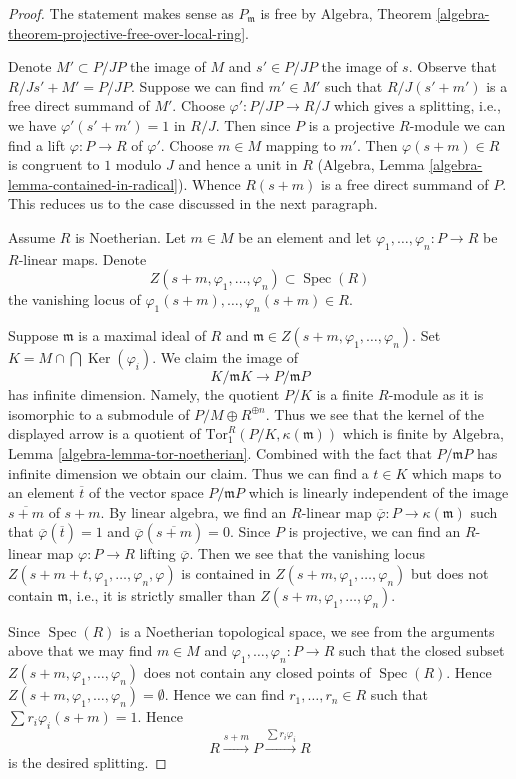 \documentclass[10pt,a4paper]{amsart}
\theoremstyle{plain}
\theoremstyle{definition}
\theoremstyle{remark}
\numberwithin{equation}{subsection}
\def\Spec{\mathop{\mathrm{Spec}}}
\def\Ker{\mathop{\mathrm{Ker}}}
\begin{document}
\begin{proof}
The statement makes sense as $P_\mathfrak m$ is free by
Algebra, Theorem \ref{algebra-theorem-projective-free-over-local-ring}.

\medskip\noindent
Denote $M' \subset P/JP$ the image of $M$ and $s' \in P/JP$ the
image of $s$. Observe that $R/J s' + M' = P/JP$.
Suppose we can find $m' \in M'$ such that
$R/J(s' + m')$ is a free direct summand of $M'$.
Choose $\varphi' : P/JP \to R/J$ which gives a splitting, i.e.,
we have $\varphi'(s' + m') = 1$ in $R/J$.
Then since $P$ is a projective $R$-module we can find
a lift $\varphi : P \to R$ of $\varphi'$.
Choose $m \in M$ mapping to $m'$.
Then $\varphi(s + m) \in R$ is congruent to $1$ modulo $J$ and hence
a unit in $R$ (Algebra, Lemma \ref{algebra-lemma-contained-in-radical}).
Whence $R(s + m)$ is a free direct summand of $P$.
This reduces us to the case discussed in the next paragraph.

\medskip\noindent
Assume $R$ is Noetherian. Let $m \in M$ be an element and let
$\varphi_1, \ldots, \varphi_n : P \to R$ be $R$-linear maps. Denote
$$
Z(s + m, \varphi_1, \ldots, \varphi_n) \subset \Spec(R)
$$
the vanishing locus of $\varphi_1(s + m), \ldots, \varphi_n(s + m) \in R$.

\medskip\noindent
Suppose $\mathfrak m$ is a maximal ideal of $R$ and
$\mathfrak m \in Z(s + m, \varphi_1, \ldots, \varphi_n)$.
Set $K = M \cap \bigcap \Ker(\varphi_i)$. We claim the image of
$$
K/\mathfrak mK \to P/\mathfrak m P
$$
has infinite dimension. Namely, the quotient $P/K$ is a finite $R$-module
as it is isomorphic to a submodule of $P/M \oplus R^{\oplus n}$.
Thus we see that
the kernel of the displayed arrow is a quotient of
$\text{Tor}_1^R(P/K, \kappa(\mathfrak m))$ which is finite
by Algebra, Lemma \ref{algebra-lemma-tor-noetherian}.
Combined with the fact that $P/\mathfrak mP$ has infinite
dimension we obtain our claim. Thus we can find a $t \in K$
which maps to an element $\overline{t}$
of the vector space $P/\mathfrak mP$ which is linearly independent
of the image $\overline{s + m}$ of $s + m$.
By linear algebra, we find an $R$-linear map
$\overline{\varphi} : P \to \kappa(\mathfrak m)$
such that $\overline{\varphi}(\overline{t}) = 1$ and
$\overline{\varphi}(\overline{s + m}) = 0$.
Since $P$ is projective, we can find an $R$-linear map
$\varphi : P \to R$ lifting $\overline{\varphi}$.
Then we see that the vanishing locus
$Z(s + m + t, \varphi_1, \ldots, \varphi_n, \varphi)$ is
contained in $Z(s + m, \varphi_1, \ldots, \varphi_n)$ but
does not contain $\mathfrak m$, i.e., it
is strictly smaller than $Z(s + m, \varphi_1, \ldots, \varphi_n)$.

\medskip\noindent
Since $\Spec(R)$ is a Noetherian topological space, we see
from the arguments above that we may find
$m \in M$ and $\varphi_1, \ldots, \varphi_n : P \to R$
such that the closed subset $Z(s + m, \varphi_1, \ldots, \varphi_n)$
does not contain any closed points of $\Spec(R)$.
Hence $Z(s + m, \varphi_1, \ldots, \varphi_n) = \emptyset$.
Hence we can find $r_1, \ldots, r_n \in R$ such that
$\sum r_i\varphi_i(s + m) = 1$. Hence
$$
R \xrightarrow{s + m} P \xrightarrow{\sum r_i \varphi_i} R
$$
is the desired splitting.
\end{proof}
\end{document}
